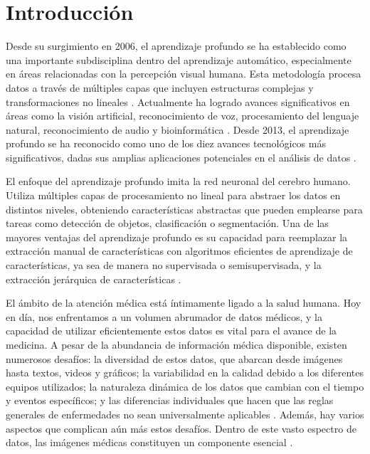 \chapter*{Introducción}\label{chapter:introduction}

Desde su surgimiento en 2006, el aprendizaje profundo se ha establecido como una importante subdisciplina dentro del aprendizaje automático, especialmente en áreas relacionadas con la percepción visual humana. Esta metodología procesa datos a través de múltiples capas que incluyen estructuras complejas y transformaciones no lineales . Actualmente ha logrado avances significativos en áreas como la visión artificial, reconocimiento de voz, procesamiento del lenguaje natural, reconocimiento de audio y bioinformática . Desde 2013, el aprendizaje profundo se ha reconocido como uno de los diez avances tecnológicos más significativos, dadas sus amplias aplicaciones potenciales en el análisis de datos .

El enfoque del aprendizaje profundo imita la red neuronal del cerebro humano. Utiliza múltiples capas de procesamiento no lineal para abstraer los datos en distintos niveles, obteniendo características abstractas que pueden emplearse para tareas como detección de objetos, clasificación o segmentación. Una de las mayores ventajas del aprendizaje profundo es su capacidad para reemplazar la extracción manual de características con algoritmos eficientes de aprendizaje de características, ya sea de manera no supervisada o semisupervisada, y la extracción jerárquica de características .

El ámbito de la atención médica está íntimamente ligado a la salud humana. Hoy en día, nos enfrentamos a un volumen abrumador de datos médicos, y la capacidad de utilizar eficientemente estos datos es vital para el avance de la medicina. A pesar de la abundancia de información médica disponible, existen numerosos desafíos: la diversidad de estos datos, que abarcan desde imágenes hasta textos, videos y gráficos; la variabilidad en la calidad debido a los diferentes equipos utilizados; la naturaleza dinámica de los datos que cambian con el tiempo y eventos específicos; y las diferencias individuales que hacen que las reglas generales de enfermedades no sean universalmente aplicables . Además, hay varios aspectos que complican aún más estos desafíos. Dentro de este vasto espectro de datos, las imágenes médicas constituyen un componente esencial .

